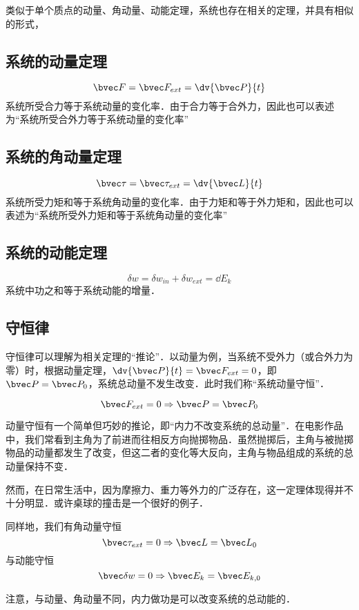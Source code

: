 
类似于单个质点的动量、角动量、动能定理，系统也存在相关的定理，并具有相似的形式，

\subsection{系统的动量定理}
\begin{equation}
\bvec F = \bvec F_{ext} = \dv{\bvec P}{t}
\end{equation}
系统所受合力等于系统动量的变化率．由于合力等于合外力，因此也可以表述为“系统所受合外力等于系统动量的变化率”

\subsection{系统的角动量定理}
\begin{equation}
\bvec \tau = \bvec \tau_{ext} = \dv{\bvec L}{t}
\end{equation}
系统所受力矩和等于系统角动量的变化率．由于力矩和等于外力矩和，因此也可以表述为“系统所受外力矩和等于系统角动量的变化率”

\subsection{系统的动能定理}
\begin{equation}
\delta w =\delta w_{in} + \delta w_{ext} = \dd E_k
\end{equation}
系统中功之和等于系统动能的增量．

\subsection{守恒律}
守恒律可以理解为相关定理的“推论”．以动量为例，当系统不受外力（或合外力为零）时，根据动量定理，$\dv{\bvec P}{t} = \bvec F_{ext}=0$，即$\bvec P = \bvec P_0$，系统总动量不发生改变．此时我们称“系统动量守恒”．

\begin{equation}
\bvec F_{ext} = 0 \Rightarrow \bvec P = \bvec P_0
\end{equation}

动量守恒有一个简单但巧妙的推论，即“内力不改变系统的总动量”．在电影作品中，我们常看到主角为了前进而往相反方向抛掷物品．虽然抛掷后，主角与被抛掷物品的动量都发生了改变，但这二者的变化等大反向，主角与物品组成的系统的总动量保持不变．

然而，在日常生活中，因为摩擦力、重力等外力的广泛存在，这一定理体现得并不十分明显．或许桌球的撞击是一个很好的例子．

同样地，我们有角动量守恒
\begin{equation}
\bvec \tau_{ext} = 0 \Rightarrow \bvec L = \bvec L_0
\end{equation}
与动能守恒
\begin{equation}
\bvec \delta w = 0 \Rightarrow \bvec E_k = \bvec E_{k,0}
\end{equation}

注意，与动量、角动量不同，内力做功是可以改变系统的总动能的．
